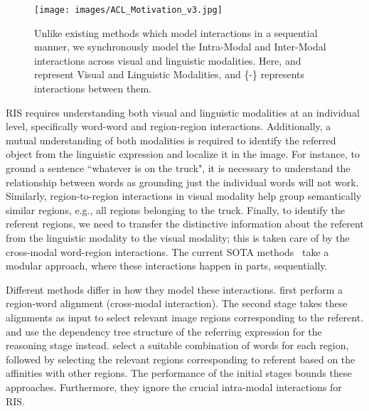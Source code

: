 \documentclass[11pt]{article}
\begin{document}
\begin{figure}[t]
\begin{center}
  \texttt{[image: images/ACL\_Motivation\_v3.jpg]}
\end{center}
  \caption{Unlike existing methods which model interactions in a sequential manner, we synchronously model the Intra-Modal and Inter-Modal interactions across visual and linguistic modalities. Here,  and  represent Visual and Linguistic Modalities, and \{-\} represents interactions between them.}
\label{fig:motivation}
\end{figure}

RIS requires understanding both visual and linguistic modalities at an individual level, specifically word-word and region-region interactions. Additionally, a mutual understanding of both modalities is required to identify the referred object from the linguistic expression and localize it in the image. For instance, to ground a sentence ``whatever is on the truck", it is necessary to understand the relationship between words as grounding just the individual words will not work. Similarly, region-to-region interactions in visual modality help group semantically similar regions, e.g., all regions belonging to the truck. Finally, to identify the referent regions, we need to transfer the distinctive information about the referent from the linguistic modality to the visual modality; this is taken care of by the cross-modal word-region interactions. The current SOTA methods~\cite{Yang_2021_CVPR, Feng_2021_CVPR, Huang_2020_CVPR, hui2020linguistic, Hu_2020_CVPR} take a modular approach, where these interactions happen in parts, sequentially.













Different methods differ in how they model these interactions. \cite{Huang_2020_CVPR} first perform a region-word alignment (cross-modal interaction). The second stage takes these alignments as input to select relevant image regions corresponding to the referent.  \cite{Yang_2021_CVPR} and \cite{hui2020linguistic} use the dependency tree structure of the referring expression for the reasoning stage instead. \cite{Hu_2020_CVPR} select a suitable combination of words for each region, followed by selecting the relevant regions corresponding to referent based on the affinities with other regions. The performance of the initial stages bounds these approaches. Furthermore, they ignore the crucial intra-modal interactions for RIS.
\end{document}
